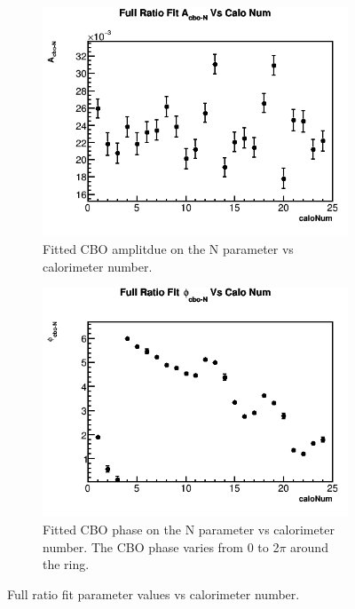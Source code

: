 \begin{figure}[h]
	    \vspace{4mm}
	    \begin{subfigure}[t]{0.4\textwidth}
		    \centering
			\includegraphics[width=\textwidth]{RatioCBOFit_A_cbo-N_Vs_Calo_Canv}
		    \caption{Fitted CBO amplitdue on the N parameter vs calorimeter number.}
	    \end{subfigure}
	    \hspace{4mm}
	    \begin{subfigure}[t]{0.4\textwidth}
		    \centering
			\includegraphics[width=\textwidth]{RatioCBOFit_phi_cbo-N_Vs_Calo_Canv}
		    \caption{Fitted CBO phase on the N parameter vs calorimeter number. The CBO phase varies from 0 to 2$\pi$ around the ring.}
	    \end{subfigure}%
	\caption[PerCaloPlots]{Full ratio fit parameter values vs calorimeter number.}
	\label{fig:PerCaloPlots}
	\end{figure}


